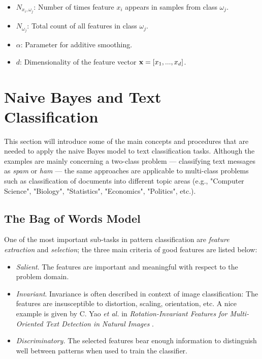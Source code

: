 \documentclass{article}
\begin{document}
\begin{itemize}
\item $N_{x_i, \omega_j}$: Number of times feature $x_i$ appears in samples from class $\omega_j$.
\item  $N_{\omega_j}$: Total count of all features in class $\omega_j$.
\item $\alpha$: Parameter for additive smoothing. 
\item $d$: Dimensionality of the feature vector $\textbf x = [x_1, ..., x_d]$.

\end{itemize}



 \section{Naive Bayes and Text Classification}

This section will introduce some of the main concepts and procedures that are needed to apply the naive Bayes model to text classification tasks. Although the examples are mainly concerning a two-class problem --- classifying text messages as \emph{spam} or \emph{ham} --- the same approaches are applicable to multi-class problems such as classification of documents into different topic areas (e.g., "Computer Science", "Biology", "Statistics", "Economics", "Politics", etc.).

\subsection{The Bag of Words Model}
\label{sec:the_bag_of_words_model}

One of the most important sub-tasks in pattern classification are \emph{feature extraction} and \emph{selection}; the three main criteria of good features are listed below:

\begin{itemize}
	\item \emph{Salient}. The features are important and meaningful with respect to the problem domain.
	\item \emph{Invariant}. Invariance is often described in context of image classification: The features are insusceptible to distortion, scaling, orientation, etc. A nice example is given by C. Yao \emph{et al.} in \emph{Rotation-Invariant Features for Multi-Oriented Text Detection in Natural Images} \cite{yao2013rotation}.
	\item \emph{Discriminatory.} The selected features bear enough information to distinguish well between patterns when used to train the classifier.
\end{itemize}
\end{document}
